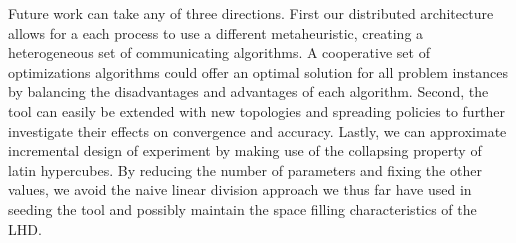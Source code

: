 Future work can take any of three directions. First our distributed architecture allows for a each process to use a different metaheuristic, creating a heterogeneous set of communicating algorithms. A cooperative set of optimizations algorithms could offer an optimal solution for all problem instances by balancing the disadvantages and advantages of each algorithm. 
Second, the tool can easily be extended with new topologies and spreading policies to further investigate their effects on convergence and accuracy. Lastly, we can approximate incremental design of experiment by making use of the collapsing property of latin hypercubes. By reducing the number of parameters and fixing the other values, we avoid the naive linear division approach we thus far have used in seeding the tool and possibly maintain the space filling characteristics of the LHD.
